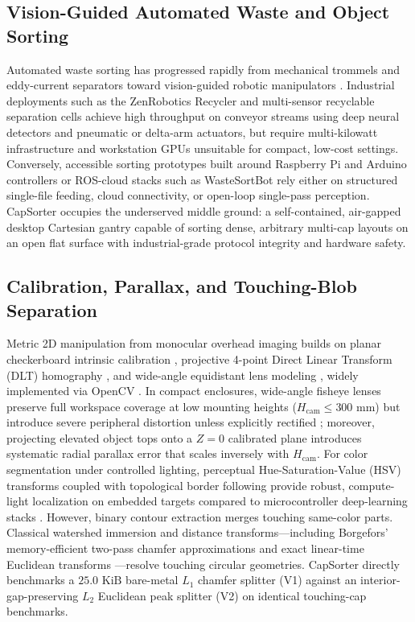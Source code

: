 \documentclass[10pt,twocolumn,letterpaper]{article}
\begin{document}
\subsection{Vision-Guided Automated Waste and Object Sorting}
Automated waste sorting has progressed rapidly from mechanical trommels and eddy-current separators toward vision-guided robotic manipulators \cite{gundupalli2017review,wilts2021artificial}. Industrial deployments such as the ZenRobotics Recycler \cite{lukka2014zenrobotics} and multi-sensor recyclable separation cells \cite{koskinopoulou2021robotic,kiyokawa2023challenges} achieve high throughput on conveyor streams using deep neural detectors and pneumatic or delta-arm actuators, but require multi-kilowatt infrastructure and workstation GPUs unsuitable for compact, low-cost settings. Conversely, accessible sorting prototypes built around Raspberry Pi and Arduino controllers \cite{pereira2014lowcost} or ROS-cloud stacks such as WasteSortBot \cite{hossen2025wastesortbot} rely either on structured single-file feeding, cloud connectivity, or open-loop single-pass perception. CapSorter occupies the underserved middle ground: a self-contained, air-gapped desktop Cartesian gantry capable of sorting dense, arbitrary multi-cap layouts on an open flat surface with industrial-grade protocol integrity and hardware safety.

\subsection{Calibration, Parallax, and Touching-Blob Separation}
Metric 2D manipulation from monocular overhead imaging builds on planar checkerboard intrinsic calibration \cite{zhang2000flexible}, projective 4-point Direct Linear Transform (DLT) homography \cite{hartley2004multiple}, and wide-angle equidistant lens modeling \cite{kannala2006generic}, widely implemented via OpenCV \cite{bradski2000opencv}. In compact enclosures, wide-angle fisheye lenses preserve full workspace coverage at low mounting heights ($H_{\mathrm{cam}} \le 300\text{ mm}$) but introduce severe peripheral distortion unless explicitly rectified \cite{kannala2006generic}; moreover, projecting elevated object tops onto a $Z=0$ calibrated plane introduces systematic radial parallax error that scales inversely with $H_{\mathrm{cam}}$. For color segmentation under controlled lighting, perceptual Hue-Saturation-Value (HSV) transforms \cite{smith1978color} coupled with topological border following \cite{suzuki1985topological} provide robust, compute-light localization on embedded targets compared to microcontroller deep-learning stacks \cite{lin2020mcunet}. However, binary contour extraction merges touching same-color parts. Classical watershed immersion \cite{vincent1991watersheds} and distance transforms—including Borgefors' memory-efficient two-pass chamfer approximations \cite{borgefors1986distance} and exact linear-time Euclidean transforms \cite{felzenszwalb2012distance}—resolve touching circular geometries. CapSorter directly benchmarks a $25.0\text{ KiB}$ bare-metal $L_1$ chamfer splitter (V1) against an interior-gap-preserving $L_2$ Euclidean peak splitter (V2) on identical touching-cap benchmarks.
\end{document}
